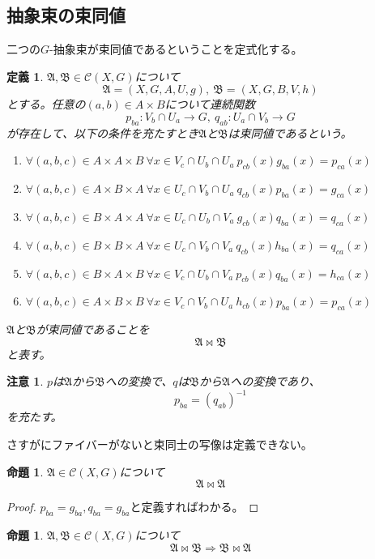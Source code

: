 \documentclass[leqno]{jsarticle}
\newtheorem{prop}[thm]{命題}
\newtheorem{df}[thm]{定義}
\newtheorem*{cau}{注意}
\newcommand{\To}{\Longrightarrow}
\begin{document}
\subsection{抽象束の束同値}
二つの$G$-抽象束が束同値であるということを定式化する。
\begin{df}
$\mathfrak{A},\mathfrak{B}\in \mathscr{C}(X,G)$について
\[
\mathfrak{A}=(X, G, A, U, g),\ \mathfrak{B}=(X, G, B, V, h)
\]
とする。任意の$(a, b)\in A\times B$について連続関数
\[
p_{ba}:V_b\cap U_a\to G,\ q_{ab}: U_a\cap V_b\to G
\]
が存在して、以下の条件を充たすとき$\mathfrak{A}$と$\mathfrak{B}$は束同値であるという。
\begin{enumerate}
\item $\forall (a,b,c)\in A\times A\times B\ \forall x\in  V_c\cap U_b\cap U_a\ p_{cb}(x)g_{ba}(x)=p_{ca}(x) $
\item $\forall (a,b,c)\in A\times B\times A\ \forall x\in  U_c\cap V_b\cap U_a\ q_{cb}(x)p_{ba}(x)=g_{ca}(x) $
\item $\forall (a,b,c)\in B\times A\times A\ \forall x\in  U_c\cap U_b\cap V_a\ g_{cb}(x)q_{ba}(x)=q_{ca}(x) $
\item $\forall (a,b,c)\in B\times B\times A\ \forall x\in  U_c\cap V_b\cap V_a\ q_{cb}(x)h_{ba}(x)=q_{ca}(x) $
\item $\forall (a,b,c)\in B\times A\times B\ \forall x\in  V_c\cap U_b\cap V_a\ p_{cb}(x)q_{ba}(x)=h_{ca}(x) $
\item $\forall (a,b,c)\in A\times B\times B\ \forall x\in  V_c\cap V_b\cap U_a\ h_{cb}(x)p_{ba}(x)=p_{ca}(x) $
\end{enumerate}
$\mathfrak{A}$と$\mathfrak{B}$が束同値であることを
\[
\mathfrak{A}\bowtie \mathfrak{B}
\]
と表す。
\end{df}
\begin{cau}
$p$は$\mathfrak{A}$から$\mathfrak{B}$への変換で、$q$は$\mathfrak{B}$から$\mathfrak{A}$への変換であり、
\[
p_{ba}=(q_{ab})^{-1}
\]
を充たす。
\end{cau}
さすがにファイバーがないと束同士の写像は定義できない。
\begin{prop}
$\mathfrak{A}\in \mathscr{C}(X,G)$について
\[
\mathfrak{A}\bowtie\mathfrak{A}
\]
\end{prop}
\begin{proof}
$p_{ba}=g_{ba}, q_{ba}=g_{ba}$と定義すればわかる。
\end{proof}
\begin{prop}
$\mathfrak{A}, \mathfrak{B}\in \mathscr{C}(X,G)$について
\[
\mathfrak{A}\bowtie \mathfrak{B}\To \mathfrak{B}\bowtie \mathfrak{A}
\]
\end{prop}
\end{document}
